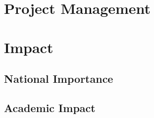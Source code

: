 
% 


\section{Project Management}
\label{sec:project_management}


\section{Impact}
\label{sec:proposed_approach}


\subsection*{National Importance}
\label{sec:national_importance}

\subsection*{Academic Impact}
\label{sec:academic_impact}



\let\oldbibliography\thebibliography
\renewcommand{\thebibliography}[1]{\oldbibliography{#1}
\setlength{\itemsep}{-3pt}}


{
\scriptsize

}

